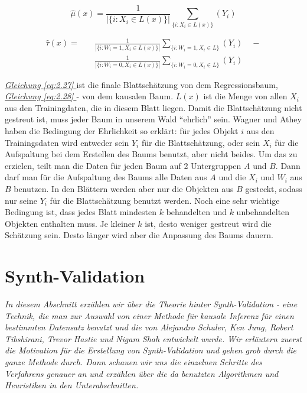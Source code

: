 \documentclass[12pt,a4paper,twoside]{scrartcl}
\numberwithin{equation}{section}
\renewcommand*{\refeq}[1]{\emph{\hyperref[#1]{Gleichung \ref*{#1} }}}
\begin{document}
\begin{equation}\label{eq:2.27}
	\hat \mu(x) = \frac{1}{|\{i : X_i \in L(x)\}|}\sum_{\{i : X_i \in L(x)\}}(Y_i)
\end{equation} 

\begin{equation}\label{eq:2.28}
\begin{split}
	\hat \tau(x) = \quad&\frac{1}{|\{i : W_i = 1,X_i \in L(x)\}|}\sum_{\{i : W_i = 1,X_i \in L\}}(Y_i)\quad - \\ 
	&\frac{1}{|\{i : W_i = 0,X_i \in L(x)\}|}\sum_{\{i : W_i = 0,X_i \in L\}}(Y_i)
\end{split}
\end{equation} 

\noindent
\refeq{eq:2.27} ist die finale Blattschätzung von dem Regressionsbaum, \refeq{eq:2.28} - von dem kausalen Baum. $L(x)$ ist die Menge von allen $X_i$ aus den Trainingdaten, die in diesem Blatt liegen. Damit die Blattschätzung nicht gestreut ist, muss jeder Baum in unserem Wald \enquote{ehrlich} sein. Wagner und Athey\cite{wager2018estimation} haben die Bedingung der Ehrlichkeit so erklärt: für jedes Objekt $i$ aus den Trainingsdaten wird entweder sein $Y_i$ für die Blattschätzung, oder sein $X_i$ für die Aufspaltung bei dem Erstellen des Baums benutzt, aber nicht beides. Um das zu erzielen, teilt man die Daten für jeden Baum auf 2 Untergruppen $A$ und $B$. Dann darf man für die Aufspaltung des Baums alle Daten aus $A$ und die $X_i$ und $W_i$ aus $B$ benutzen. In den Blättern werden aber nur die Objekten aus $B$ gesteckt, sodass nur seine $Y_i$ für die Blattschätzung benutzt werden. Noch eine sehr wichtige Bedingung ist, dass jedes Blatt mindesten $k$ behandelten und $k$ unbehandelten Objekten enthalten muss. Je kleiner $k$ ist, desto weniger gestreut wird die Schätzung sein. Desto länger wird aber die Anpassung des Baums dauern\cite{wager2018estimation}.   

\clearpage

\section{Synth-Validation}\label{sec:synthValidation}

\noindent
\emph{In diesem Abschnitt erzählen wir über die Theorie hinter Synth-Validation - eine Technik, die man zur Auswahl von einer Methode für kausale Inferenz für einen bestimmten Datensatz benutzt und die von Alejandro Schuler, Ken Jung, Robert Tibshirani, Trevor Hastie und Nigam Shah entwickelt wurde\cite{schuler2017synth}. Wir erläutern zuerst die Motivation für die Erstellung von Synth-Validation und gehen grob durch die ganze Methode durch. Dann schauen wir uns die einzelnen Schritte des Verfahrens genauer an und erzählen über die da benutzten Algorithmen und Heuristiken in den Unterabschnitten.}\par
\end{document}
